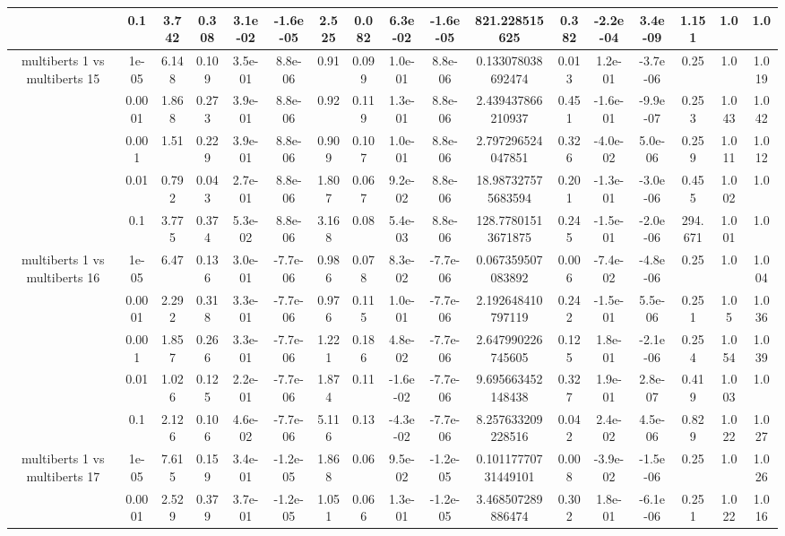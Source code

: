 \begin{tabular}{|c|c|c|c|c|c|c|c|c|c|c|c|c|c|c|c|c|}
 & 0.1 & 3.742 & 0.308 & 3.1e-02 & -1.6e-05 & 2.525 & 0.082 & 6.3e-02 & -1.6e-05 & 821.228515625 & 0.382 & -2.2e-04 & 3.4e-09 & 1.151 & 1.0 & 1.0 \\
\hline
\multirow{5}{*}{multiberts 1 vs multiberts 15} & 1e-05 & 6.148 & 0.109 & 3.5e-01 & 8.8e-06 & 0.91 & 0.099 & 1.0e-01 & 8.8e-06 & 0.133078038692474 & 0.013 & 1.2e-01 & -3.7e-06 & 0.25 & 1.0 & 1.019 \\
 & 0.0001 & 1.868 & 0.273 & 3.9e-01 & 8.8e-06 & 0.92 & 0.119 & 1.3e-01 & 8.8e-06 & 2.439437866210937 & 0.451 & -1.6e-01 & -9.9e-07 & 0.253 & 1.043 & 1.042 \\
 & 0.001 & 1.51 & 0.229 & 3.9e-01 & 8.8e-06 & 0.909 & 0.107 & 1.0e-01 & 8.8e-06 & 2.797296524047851 & 0.326 & -4.0e-02 & 5.0e-06 & 0.259 & 1.011 & 1.012 \\
 & 0.01 & 0.792 & 0.043 & 2.7e-01 & 8.8e-06 & 1.807 & 0.067 & 9.2e-02 & 8.8e-06 & 18.987327575683594 & 0.201 & -1.3e-01 & -3.0e-06 & 0.455 & 1.002 & 1.0 \\
 & 0.1 & 3.775 & 0.374 & 5.3e-02 & 8.8e-06 & 3.168 & 0.08 & 5.4e-03 & 8.8e-06 & 128.77801513671875 & 0.245 & -1.5e-01 & -2.0e-06 & 294.671 & 1.001 & 1.0 \\
\hline
\multirow{5}{*}{multiberts 1 vs multiberts 16} & 1e-05 & 6.47 & 0.136 & 3.0e-01 & -7.7e-06 & 0.986 & 0.078 & 8.3e-02 & -7.7e-06 & 0.067359507083892 & 0.006 & -7.4e-02 & -4.8e-06 & 0.25 & 1.0 & 1.004 \\
 & 0.0001 & 2.292 & 0.318 & 3.3e-01 & -7.7e-06 & 0.976 & 0.115 & 1.0e-01 & -7.7e-06 & 2.192648410797119 & 0.242 & -1.5e-01 & 5.5e-06 & 0.251 & 1.05 & 1.036 \\
 & 0.001 & 1.857 & 0.266 & 3.3e-01 & -7.7e-06 & 1.221 & 0.186 & 4.8e-02 & -7.7e-06 & 2.647990226745605 & 0.125 & 1.8e-01 & -2.1e-06 & 0.254 & 1.054 & 1.039 \\
 & 0.01 & 1.026 & 0.125 & 2.2e-01 & -7.7e-06 & 1.874 & 0.11 & -1.6e-02 & -7.7e-06 & 9.695663452148438 & 0.327 & 1.9e-01 & 2.8e-07 & 0.419 & 1.003 & 1.0 \\
 & 0.1 & 2.126 & 0.106 & 4.6e-02 & -7.7e-06 & 5.116 & 0.13 & -4.3e-02 & -7.7e-06 & 8.257633209228516 & 0.042 & 2.4e-02 & 4.5e-06 & 0.829 & 1.022 & 1.027 \\
\hline
\multirow{5}{*}{multiberts 1 vs multiberts 17} & 1e-05 & 7.615 & 0.159 & 3.4e-01 & -1.2e-05 & 1.868 & 0.06 & 9.5e-02 & -1.2e-05 & 0.10117770731449101 & 0.008 & -3.9e-02 & -1.5e-06 & 0.25 & 1.0 & 1.026 \\
 & 0.0001 & 2.529 & 0.379 & 3.7e-01 & -1.2e-05 & 1.051 & 0.066 & 1.3e-01 & -1.2e-05 & 3.468507289886474 & 0.302 & 1.8e-01 & -6.1e-06 & 0.251 & 1.022 & 1.016 \\

\end{tabular}

